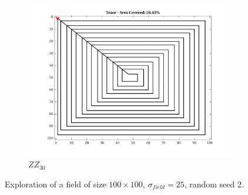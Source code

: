 \begin{figure}[htb!]
    \begin{subfigure}[t]{0.25\textwidth}
        \centering
        \includegraphics[width=\linewidth]{figures/path_zz_30p_100x100_sf_25_seed_2.png}
        \captionsetup{skip=0.20\baselineskip,size=footnotesize}
        \caption{$ZZ_{30}$}
    \end{subfigure}%
    \captionsetup{skip=0.20\baselineskip}
    \caption{Exploration of a field of size $100 \times 100$, $\sigma_{field} = 25$, random seed 2.}
    \label{fig:sf25}
\end{figure}

